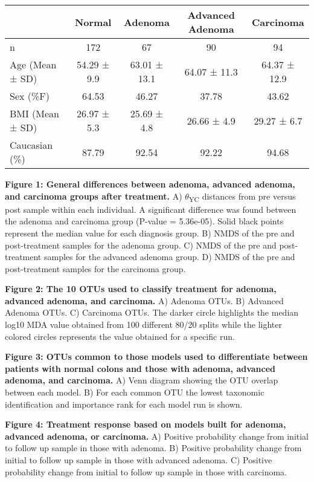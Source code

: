 \documentclass[12pt,]{article}
\begin{document}
\begin{longtable}[]{@{}lcccc@{}}
\toprule
& Normal & Adenoma & Advanced Adenoma & Carcinoma\tabularnewline
\midrule
\endhead
n & 172 & 67 & 90 & 94\tabularnewline
Age (Mean ± SD) & 54.29 ± 9.9 & 63.01 ± 13.1 & 64.07 ± 11.3 & 64.37 ±
12.9\tabularnewline
Sex (\%F) & 64.53 & 46.27 & 37.78 & 43.62\tabularnewline
BMI (Mean ± SD) & 26.97 ± 5.3 & 25.69 ± 4.8 & 26.66 ± 4.9 & 29.27 ±
6.7\tabularnewline
Caucasian (\%) & 87.79 & 92.54 & 92.22 & 94.68\tabularnewline
\bottomrule
\end{longtable}

\newpage

\textbf{Figure 1: General differences between adenoma, advanced adenoma,
and carcinoma groups after treatment.} A) \(\theta\)\textsubscript{YC}
distances from pre versus post sample within each individual. A
significant difference was found between the adenoma and carcinoma group
(P-value = 5.36e-05). Solid black points represent the median value for
each diagnosis group. B) NMDS of the pre and post-treatment samples for
the adenoma group. C) NMDS of the pre and post-treatment samples for the
advanced adenoma group. D) NMDS of the pre and post-treatment samples
for the carcinoma group.

\textbf{Figure 2: The 10 OTUs used to classify treatment for adenoma,
advanced adenoma, and carcinoma.} A) Adenoma OTUs. B) Advanced Adenoma
OTUs. C) Carcinoma OTUs. The darker circle highlights the median log10
MDA value obtained from 100 different 80/20 splits while the lighter
colored circles represents the value obtained for a specific run.

\textbf{Figure 3: OTUs common to those models used to differentiate
between patients with normal colons and those with adenoma, advanced
adenoma, and carcinoma.} A) Venn diagram showing the OTU overlap between
each model. B) For each common OTU the lowest taxonomic identification
and importance rank for each model run is shown.

\textbf{Figure 4: Treatment response based on models built for adenoma,
advanced adenoma, or carcinoma.} A) Positive probability change from
initial to follow up sample in those with adenoma. B) Positive
probability change from initial to follow up sample in those with
advanced adenoma. C) Positive probability change from initial to follow
up sample in those with carcinoma.

\newpage
\end{document}
